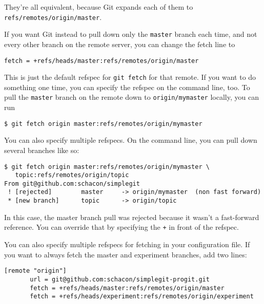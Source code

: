 \documentclass[a4paper]{book}
\begin{document}
They're all equivalent, because Git expands each of them to \texttt{refs/remotes/origin/master}.

If you want Git instead to pull down only the \texttt{master} branch each time, and not every other branch on the remote server, you can change the fetch line to

\begin{shaded}\begin{verbatim}
fetch = +refs/heads/master:refs/remotes/origin/master
\end{verbatim}\end{shaded}

This is just the default refspec for \texttt{git fetch} for that remote. If you want to do something one time, you can specify the refspec on the command line, too. To pull the \texttt{master} branch on the remote down to \texttt{origin/mymaster} locally, you can run

\begin{shaded}\begin{verbatim}
$ git fetch origin master:refs/remotes/origin/mymaster
\end{verbatim}\end{shaded}

You can also specify multiple refspecs. On the command line, you can pull down several branches like so:

\begin{shaded}\begin{verbatim}
$ git fetch origin master:refs/remotes/origin/mymaster \
   topic:refs/remotes/origin/topic
From git@github.com:schacon/simplegit
 ! [rejected]        master     -> origin/mymaster  (non fast forward)
 * [new branch]      topic      -> origin/topic
\end{verbatim}\end{shaded}

In this case, the master branch pull was rejected because it wasn't a fast-forward reference. You can override that by specifying the \texttt{+} in front of the refspec.

You can also specify multiple refspecs for fetching in your configuration file. If you want to always fetch the master and experiment branches, add two lines:

\begin{shaded}\begin{verbatim}
[remote "origin"]
       url = git@github.com:schacon/simplegit-progit.git
       fetch = +refs/heads/master:refs/remotes/origin/master
       fetch = +refs/heads/experiment:refs/remotes/origin/experiment
\end{verbatim}\end{shaded}
\end{document}
